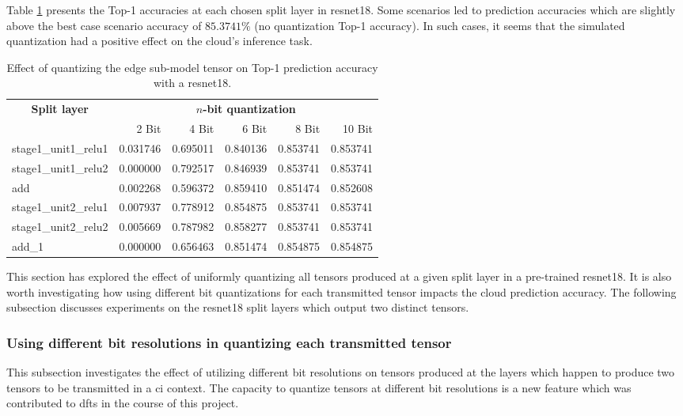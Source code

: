 Table \ref{table:quant:fig1:resnet18} presents the Top-1 accuracies at each chosen split layer in \gls{resnet18}. Some scenarios led to prediction accuracies which are slightly above the best case scenario accuracy of $85.3741\%$ (no quantization Top-1 accuracy). In such cases, it seems that the simulated quantization had a positive effect on the cloud's inference task. 

\begin{table}[H]
	\caption[Effect of quantizing the edge sub-model tensor on Top-1 prediction accuracy with a Resnet18]{Effect of quantizing the edge sub-model tensor on Top-1 prediction accuracy with a \gls{resnet18}.}\label{table:quant:fig1:resnet18}
	\centering 
	\begin{adjustbox}{max width=\textwidth}
\begin{tabular}{|l|rrrrr|}
	\hline 
	\multicolumn{1}{|c|}{\textbf{Split layer}} &
	\multicolumn{5}{c|}{$n$\textbf{-bit quantization}} \\ 
	{} 	&        2 Bit  &        4 Bit  &        6 Bit  &        8 Bit  &        10 Bit \\
	\hline
stage1\_unit1\_relu1 &  0.031746 &  0.695011 &  0.840136 &  0.853741 &  0.853741 \\
stage1\_unit1\_relu2 &  0.000000 &  0.792517 &  0.846939 &  0.853741 &  0.853741 \\
add                &  0.002268 &  0.596372 &  0.859410 &  0.851474 &  0.852608 \\
stage1\_unit2\_relu1 &  0.007937 &  0.778912 &  0.854875 &  0.853741 &  0.853741 \\
stage1\_unit2\_relu2 &  0.005669 &  0.787982 &  0.858277 &  0.853741 &  0.853741 \\
add\_1              &  0.000000 &  0.656463 &  0.851474 &  0.854875 &  0.854875 \\
	\hline
\end{tabular}%
\end{adjustbox}
\end{table}

This section has explored the effect of uniformly quantizing all tensors produced at a given split layer in a pre-trained \gls{resnet18}. It is also worth investigating how using different bit quantizations for each transmitted tensor impacts the cloud prediction accuracy. The following subsection discusses experiments on the \gls{resnet18} split layers which output two distinct tensors.

\subsubsection{Using different bit resolutions in quantizing each transmitted tensor}
This subsection investigates the effect of utilizing different bit resolutions on tensors produced at the layers which happen to produce two tensors to be transmitted in a \gls{ci} context. The capacity to quantize tensors at different bit resolutions is a new feature which was contributed to \gls{dfts} in the course of this project.

